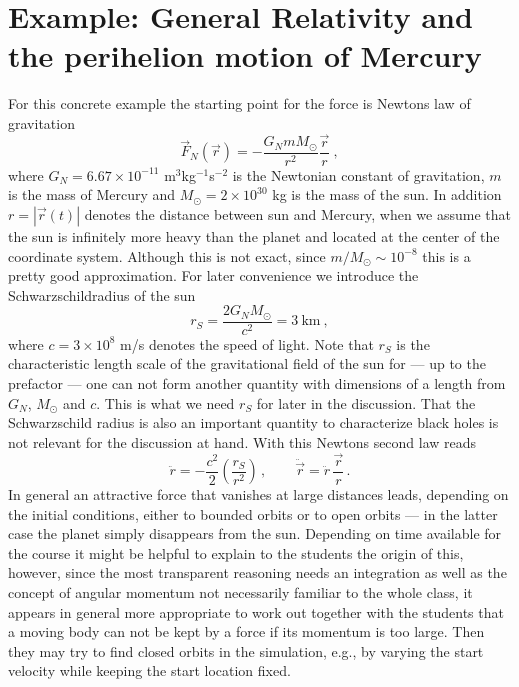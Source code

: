 \documentclass[12pt, UK english]{iopart}
\begin{document}
\section{Example: General Relativity and the perihelion motion of Mercury}\label{sec:gr}
For this concrete example the starting point for the force is Newtons law of gravitation
\begin{equation}
\vec F_N(\vec r) = - \frac{G_N m M_\odot}{r^2} \frac{\vec r}{r}\ ,
\end{equation}
where $G_N=6.67\times 10^{-11}$ m$^3$kg$^{-1}$s$^{-2}$ is the Newtonian constant of gravitation, $m$ is the mass of Mercury and $M_\odot=2\times 10^{30}$ kg is the mass of the sun.
In addition $r=|\vec r(t)|$ denotes the distance between sun and Mercury, when we assume that the sun is infinitely more heavy than the planet and located at the center of the coordinate system. 
Although this is not exact, since $m/M_\odot\sim 10^{-8}$ this is a pretty good approximation.
For later convenience we introduce the Schwarzschildradius of the sun
\begin{equation}
r_S=\frac{2G_N  M_\odot}{c^2} = 3 \ \mbox{km} \ ,
\end{equation}
where $c=3\times 10^8$ m/s denotes the speed of light.
Note that $r_S$ is the characteristic length scale of the gravitational field of the sun for --- up to the prefactor --- one can not form another quantity with dimensions of a length from $G_N$, $M_\odot$ and $c$.
This is what we need $r_S$ for later in the discussion.
That the Schwarzschild radius is also an important quantity to characterize black holes is not relevant for the discussion at hand.
With this Newtons second law reads 
\begin{equation}
	\ddot{r}      = - \frac{c^2}{2}\left(\frac{r_S}{r^2}\right) \, , \qquad
	\ddot{\vec r} =   \ddot{r} \, \frac{\vec{r}}{r} \, .
\label{eq:newton}
\end{equation}
In general an attractive force that vanishes at large distances leads,  depending on the initial conditions, either to bounded orbits or to open orbits --- in the latter case the planet simply disappears from the sun.
Depending on time available for the course it might be helpful to explain to the students the origin of this, however, since the most transparent reasoning needs an integration as well as the concept of angular momentum not necessarily familiar to the whole class, it appears in general more appropriate to work out together with the students that a moving body can not be kept by a force if its momentum is too large.
Then they may try to find closed orbits in the simulation, e.g., by varying the start velocity while keeping the start location fixed.
\end{document}
